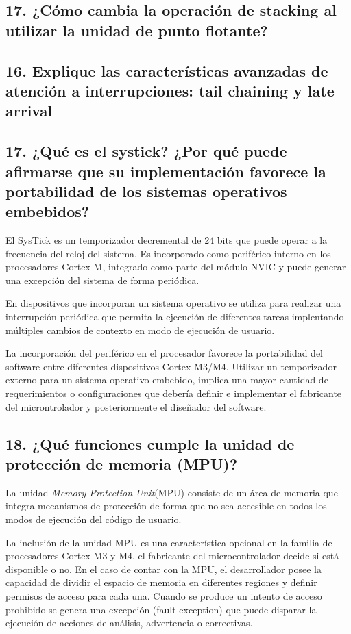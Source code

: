 \documentclass[10pt,a4paper,twoside,spanish]{article}	%
\begin{document}
\subsection*{17. ¿Cómo cambia la operación de stacking al utilizar la unidad de punto flotante?}

\subsection*{16. Explique las características avanzadas de atención a interrupciones: tail chaining y late arrival}

\subsection*{17. ¿Qué es el systick? ¿Por qué puede afirmarse que su implementación favorece la portabilidad de los sistemas operativos embebidos?}

El SysTick es un temporizador decremental de 24 bits que puede operar a la frecuencia del reloj del sistema. Es incorporado como periférico interno en los procesadores Cortex-M, integrado como parte del módulo NVIC y puede generar una excepción del sistema de forma periódica.

En dispositivos que incorporan un sistema operativo se utiliza para realizar una interrupción periódica que permita la ejecución de diferentes tareas implentando múltiples cambios de contexto en modo de ejecución de usuario. 

La incorporación del periférico en el procesador favorece la portabilidad del software entre diferentes dispositivos Cortex-M3/M4. Utilizar un temporizador externo para un sistema operativo embebido, implica una mayor cantidad de requerimientos o configuraciones que debería definir e implementar el fabricante del microntrolador y posteriormente el diseñador del software.  



\subsection*{18. ¿Qué funciones cumple la unidad de protección de memoria (MPU)?}

La unidad \textit{Memory Protection Unit}(MPU) consiste de un área de memoria que integra mecanismos de protección de forma que no sea accesible en todos los modos de ejecución del código de usuario. 

La inclusión de la unidad MPU es una característica opcional en la familia de procesadores Cortex-M3 y M4, el fabricante del microcontrolador decide si está disponible o no. En el caso de contar con la MPU, el desarrollador posee la capacidad de dividir el espacio de memoria en diferentes regiones y definir permisos de acceso para cada una. Cuando se produce un intento de acceso prohibido se genera una excepción (fault exception) que puede disparar la ejecución de acciones de análisis, advertencia o correctivas. 
\end{document}
